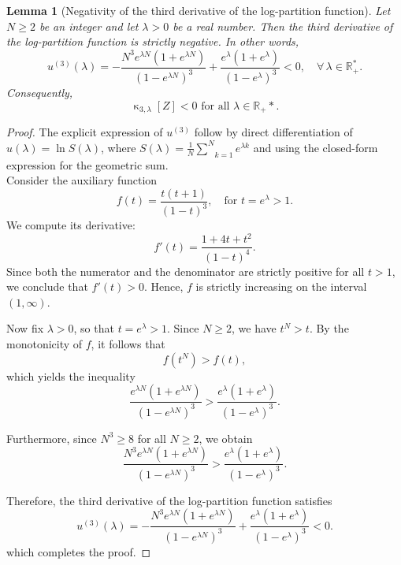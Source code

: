 \documentclass[a4paper, 10pt]{article}
\newcommand{\beq}{\begin{equation}}
\newcommand{\eeq}{\end{equation}}
\newtheorem{lemma}{Lemma}[section]
\theoremstyle{definition}
\begin{document}
\begin{lemma}
[Negativity of the third derivative of the log-partition function]\label{lemma:neg_third_deriv}
Let \( N \geq 2 \) be an integer and let \( \lambda > 0 \) be a real number. Then the third derivative of the log-partition function is strictly negative. In other words,
\beq
u^{(3)}(\lambda) = -\frac{N^3 e^{\lambda N}(1 + e^{\lambda N})}{(1 - e^{\lambda N})^3} + \frac{e^{\lambda}(1 + e^{\lambda})}{(1 - e^{\lambda})^3} < 0, \quad \forall\, \lambda\in \mathbb{R^*_+}.
\eeq
Consequently,
\beq
\operatorname{\kappa}_{3,\lambda}[Z] < 0 \text{ for all } \lambda \in \mathbb{R}_+ *.
\eeq
\end{lemma}
\begin{proof}
The explicit expression  of \( u^{(3)}\) follow by direct differentiation of \( u(\lambda) = \ln S(\lambda) \), where $ S(\lambda) = \frac{1}{N}\underset{k=1}{\overset{N}{\sum}}e^{\lambda k}$ and using the closed-form expression for the geometric sum.\\
Consider the auxiliary function
\[
f(t) = \frac{t(t + 1)}{(1 - t)^3}, \quad \text{for } t = e^{\lambda} > 1.
\]
We compute its derivative:
\[
f'(t) = \frac{1 + 4t + t^2}{(1 - t)^4}.
\]
Since both the numerator and the denominator are strictly positive for all \( t > 1 \), we conclude that \( f'(t) > 0 \). Hence, \( f \) is strictly increasing on the interval \( (1, \infty) \).

Now fix \( \lambda > 0 \), so that \( t = e^{\lambda} > 1 \). Since \( N \geq 2 \), we have \( t^N > t \). By the monotonicity of \( f \), it follows that
\[
f(t^N) > f(t),
\]
which yields the inequality
\[
\frac{e^{\lambda N}(1 + e^{\lambda N})}{(1 - e^{\lambda N})^3} > \frac{e^{\lambda}(1 + e^{\lambda})}{(1 - e^{\lambda})^3}.
\]

Furthermore, since \( N^3 \geq 8 \) for all \( N \geq 2 \), we obtain
\[
\frac{N^3 e^{\lambda N}(1 + e^{\lambda N})}{(1 - e^{\lambda N})^3} > \frac{e^{\lambda}(1 + e^{\lambda})}{(1 - e^{\lambda})^3}.
\]

Therefore, the third derivative of the log-partition function satisfies
\[
u^{(3)}(\lambda) 
= - \frac{N^3 e^{\lambda N}(1 + e^{\lambda N})}{(1 - e^{\lambda N})^3}
+ \frac{e^{\lambda}(1 + e^{\lambda})}{(1 - e^{\lambda})^3}
< 0.
\]
which completes the proof.
\end{proof}
\end{document}
